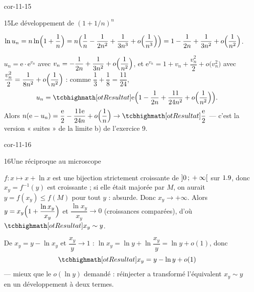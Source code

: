 \begin{blocLivre}{cor-11-15}
\begin{corrige}{15}{Le développement de $(1+1/n)^{n}$}
\begin{questions}
  \item $\ln u_n=n\ln\Bigl(1+\dfrac1n\Bigr)
    =n\Bigl(\dfrac1n-\dfrac{1}{2n^{2}}+\dfrac{1}{3n^{3}}+o\Bigl(\dfrac{1}{n^{3}}\Bigr)\Bigr)
    =1-\dfrac{1}{2n}+\dfrac{1}{3n^{2}}+o\Bigl(\dfrac{1}{n^{2}}\Bigr)$.
  \item $u_n=\mathrm{e}\cdot\mathrm{e}^{v_n}$ avec
    $v_n=-\dfrac{1}{2n}+\dfrac{1}{3n^{2}}+o\Bigl(\dfrac{1}{n^{2}}\Bigr)$, et
    $\mathrm{e}^{v_n}=1+v_n+\dfrac{v_n^{2}}{2}+o\bigl(v_n^{2}\bigr)$ avec
    $\dfrac{v_n^{2}}{2}=\dfrac{1}{8n^{2}}+o\Bigl(\dfrac{1}{n^{2}}\Bigr)$ :
    comme $\dfrac13+\dfrac18=\dfrac{11}{24}$,
    \[
    u_n=\res{\mathrm{e}\Bigl(1-\frac{1}{2n}+\frac{11}{24n^{2}}
      +o\Bigl(\frac{1}{n^{2}}\Bigr)\Bigr)}.
    \]
    Alors $n(\mathrm{e}-u_n)=\dfrac{\mathrm{e}}{2}-\dfrac{11\mathrm{e}}{24n}
    +o\Bigl(\dfrac1n\Bigr)\to\res{\dfrac{\mathrm{e}}{2}}$ — c'est la version
    « suites » de la limite b) de l'exercice 9.
\end{questions}
\end{corrige}
\end{blocLivre}

\begin{blocLivre}{cor-11-16}
\begin{corrige}{16}{Une réciproque au microscope}
\begin{questions}
  \item $f:x\mapsto x+\ln x$ est une bijection strictement croissante de
    $\mathopen{]}0\,{;}\,+\infty\mathclose{[}$ sur $1.9$, donc $x_y=f^{-1}(y)$ est croissante ;
    si elle était majorée par $M$, on aurait $y=f(x_y)\leqslant f(M)$ pour
    tout $y$ : absurde. Donc $x_y\to+\infty$. Alors
    $y=x_y\Bigl(1+\dfrac{\ln x_y}{x_y}\Bigr)$ et
    $\dfrac{\ln x_y}{x_y}\to0$ (croissances comparées), d'où
    $\res{x_y\sim y}$.
  \item De $x_y=y-\ln x_y$ et $\dfrac{x_y}{y}\to1$ :
    $\ln x_y=\ln y+\ln\dfrac{x_y}{y}=\ln y+o(1)$, donc
    \[
    \res{x_y=y-\ln y+o(1)}
    \]
    — mieux que le $o(\ln y)$ demandé : réinjecter a transformé
    l'équivalent $x_y\sim y$ en un développement à deux termes.
\end{questions}
\end{corrige}
\end{blocLivre}

